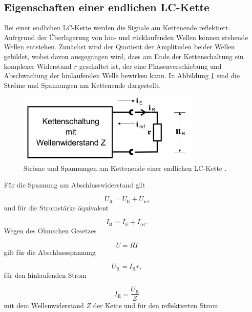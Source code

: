 \subsection{Eigenschaften einer endlichen LC-Kette}

Bei einer endlichen LC-Kette werden die Signale am Kettenende reflektiert.
Aufrgrund der Überlagerung von hin- und rücklaufenden Wellen können
stehende Wellen entstehen.
Zunächst wird der Quotient der Amplituden beider Wellen gebildet, wobei davon
ausgegangen wird, dass am Ende der Kettenschaltung ein komplexer Widerstand
$r$ geschaltet ist, der eine Phasenverschiebung und Abschwächung der
hinlaufenden Welle bewirken kann.
In Abbildung \ref{fig:Abschluss} sind die Ströme und Spannungen am Kettenende
dargestellt.

\begin{figure}
  \centering
  \includegraphics[height = 3.5cm]{Abschlusswiderstand.png}
  \caption{Ströme und Spannungen am Kettenende einer endlichen LC-Kette
  \cite{anleitung}.}
  \label{fig:Abschluss}
\end{figure}

Für die Spannung am Abschlusswiderstand gilt

\begin{equation}
  U_\text{R} = U_\text{E} + U_\text{ref}
\end{equation}
und für die Stromstärke äquivalent

\begin{equation}
  I_\text{R} = I_\text{E} + I_\text{ref}.
\end{equation}
Wegen des Ohmschen Gesetzes

\begin{equation}
  U = RI
\end{equation}
gilt für die Abschlussspannung

\begin{equation}
  U_\text{R} = I_\text{R} r,
\end{equation}
für den hinlaufenden Strom

\begin{equation}
  I_\text{E} = \frac{U_\text{E}}{Z}
\end{equation}
mit dem Wellenwiderstand $Z$ der Kette und für den reflektierten Strom

